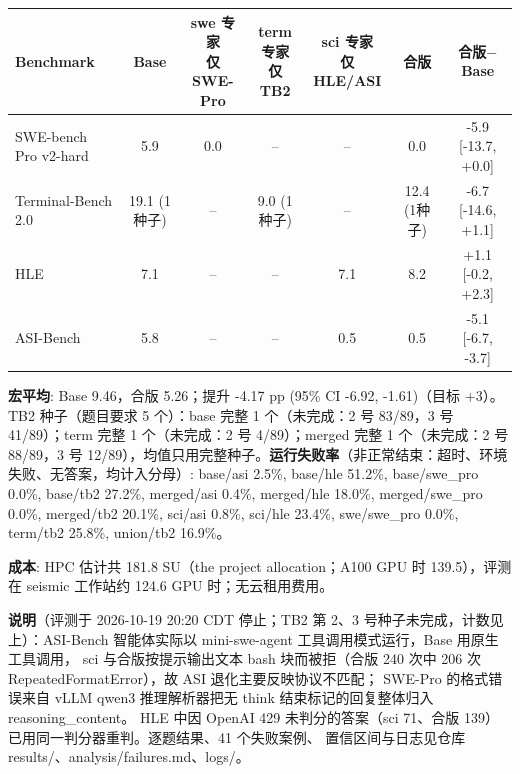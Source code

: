 \documentclass[9pt]{extarticle}
\begin{document}
\begin{center}\small
\begin{tabular}{lcccccc}
\toprule
Benchmark & Base & \shortstack{swe 专家\\\scriptsize 仅 SWE-Pro} & \shortstack{term 专家\\\scriptsize 仅 TB2} & \shortstack{sci 专家\\\scriptsize 仅 HLE/ASI} & 合版 & 合版$-$Base \\
\midrule
SWE-bench Pro v2-hard & 5.9 & 0.0 & -- & -- & 0.0 & -5.9 [-13.7, +0.0] \\
Terminal-Bench 2.0 & 19.1 (1种子) & -- & 9.0 (1种子) & -- & 12.4 (1种子) & -6.7 [-14.6, +1.1] \\
HLE & 7.1 & -- & -- & 7.1 & 8.2 & +1.1 [-0.2, +2.3] \\
ASI-Bench & 5.8 & -- & -- & 0.5 & 0.5 & -5.1 [-6.7, -3.7] \\
\bottomrule
\end{tabular}
\end{center}

\textbf{宏平均}: Base 9.46，合版 5.26；提升 -4.17 pp (95\% CI -6.92, -1.61)（目标 +3）。TB2 种子（题目要求 5 个）：base 完整 1 个（未完成：2 号 83/89，3 号 41/89）；term 完整 1 个（未完成：2 号 4/89）；merged 完整 1 个（未完成：2 号 88/89，3 号 12/89），均值只用完整种子。\quad \textbf{运行失败率}（非正常结束：超时、环境失败、无答案，均计入分母）: base/asi 2.5\%, base/hle 51.2\%, base/swe\_pro 0.0\%, base/tb2 27.2\%, merged/asi 0.4\%, merged/hle 18.0\%, merged/swe\_pro 0.0\%, merged/tb2 20.1\%, sci/asi 0.8\%, sci/hle 23.4\%, swe/swe\_pro 0.0\%, term/tb2 25.8\%, union/tb2 16.9\%。

\textbf{成本}: HPC 估计共 181.8 SU（the project allocation；A100 GPU 时 139.5），评测在 seismic 工作站约 124.6 GPU 时；无云租用费用。

\textbf{说明}（评测于 2026-10-19 20:20 CDT 停止；TB2 第 2、3 号种子未完成，计数见上）：ASI-Bench 智能体实际以 mini-swe-agent 工具调用模式运行，Base 用原生工具调用， sci 与合版按提示输出文本 bash 块而被拒（合版 240 次中 206 次 RepeatedFormatError），故 ASI 退化主要反映协议不匹配； SWE-Pro 的格式错误来自 vLLM qwen3 推理解析器把无 think 结束标记的回复整体归入 reasoning\_content。 HLE 中因 OpenAI 429 未判分的答案（sci 71、合版 139）已用同一判分器重判。逐题结果、41 个失败案例、 置信区间与日志见仓库 results/、analysis/failures.md、logs/。
\end{document}
